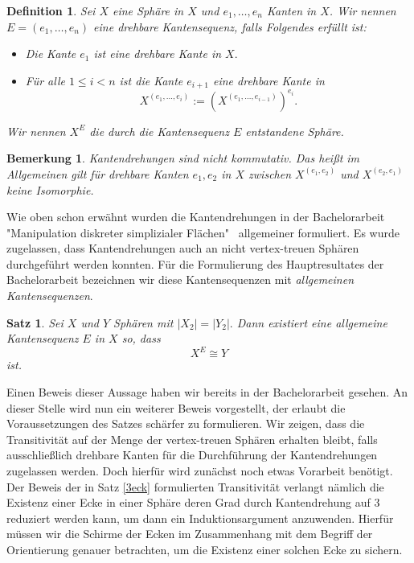\documentclass[12pt,titlepage,twoside,cleardoublepage]{article}
\theoremstyle{nummermitklammern}
\newtheorem{definition}[temp]{Definition}
\newtheorem{bemerkung}[temp]{Bemerkung}
\newtheorem{satz}[temp]{Satz}
\newtheorem{definition}[zahl]{Definition}
\newtheorem{bemerkung}[zahl]{Bemerkung}
\newtheorem{satz}[zahl]{Satz}
\numberwithin{equation}{section}
\begin{document}
\begin{definition}
Sei $X$ eine Sphäre in $X$ und $e_1,\ldots,e_n$ Kanten in $X$. Wir nennen $E=(e_1,\ldots,e_n)$ eine \emph{drehbare Kantensequenz}, falls Folgendes erfüllt ist: 
\begin{itemize}
\item Die Kante $e_1$ ist eine drehbare Kante in $X.$ 
\item Für alle $1\leq i < n$ ist die Kante $e_{i+1}$ eine drehbare Kante in 
\[
X^{(e_1,\ldots,e_i)}:=(X^{(e_1,\ldots,e_{i-1})})^{e_i}.
\] 
\end{itemize}
Wir nennen $X^E$ die durch die Kantensequenz $E$ entstandene Sphäre. 
\end{definition}

\begin{bemerkung}
Kantendrehungen sind nicht kommutativ. Das heißt im Allgemeinen gilt für drehbare Kanten $e_1,e_2$ in $X$ zwischen $X^{(e_1,e_2)}$ und $X^{(e_2,e_1)}$ keine Isomorphie. 

\end{bemerkung}

Wie oben schon erwähnt wurden die Kantendrehungen in der Bachelorarbeit "Manipulation diskreter simplizialer Flächen"  \,
 allgemeiner formuliert. Es wurde zugelassen, dass Kantendrehungen auch an nicht vertex-treuen Sphären durchgeführt werden konnten. Für die Formulierung des Hauptresultates der Bachelorarbeit bezeichnen wir diese Kantensequenzen mit \emph{allgemeinen Kantensequenzen}.
\begin{satz}
Sei $X$ und $Y$ Sphären mit $\vert X_2\vert=\vert Y_2\vert.$ Dann existiert eine allgemeine Kantensequenz $E$ in $X$ so, dass 
\[
X^E \cong Y
\]
ist. 
\end{satz}
Einen Beweis dieser Aussage haben wir bereits in der Bachelorarbeit gesehen. An dieser Stelle wird nun ein weiterer Beweis vorgestellt, der erlaubt die Voraussetzungen des Satzes schärfer zu formulieren. Wir zeigen, dass die Transitivität auf der Menge der vertex-treuen Sphären erhalten bleibt, falls ausschließlich drehbare Kanten für die Durchführung der Kantendrehungen zugelassen werden. Doch hierfür wird zunächst noch etwas Vorarbeit benötigt.\\ 
Der Beweis der in Satz \ref{3eck} formulierten Transitivität verlangt nämlich die Existenz einer Ecke in einer Sphäre deren Grad durch Kantendrehung auf 3 reduziert werden kann, um dann ein Induktionsargument anzuwenden. Hierfür müssen wir die Schirme der Ecken im Zusammenhang mit dem Begriff der Orientierung genauer betrachten, um die Existenz einer solchen Ecke zu sichern.
\end{document}
